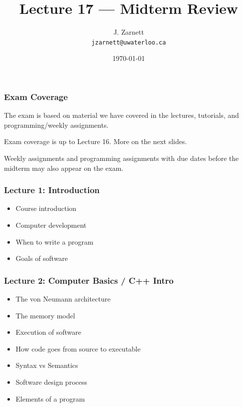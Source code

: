 

\title{Lecture 17 --- Midterm Review }

\author{J. Zarnett\\
\texttt{jzarnett@uwaterloo.ca}}
\date{\today}



\begin{frame}
  \titlepage
  
 \end{frame}




\begin{frame}
\frametitle{Exam Coverage}

The exam is based on material we have covered in the lectures, tutorials, and programming/weekly assignments.

Exam coverage is up to Lecture 16. More on the next slides.

Weekly assignments and programming assignments with due dates before the midterm may also appear on the exam. 

\end{frame}


\begin{frame}
\frametitle{Lecture 1: Introduction}

{\Large
\begin{itemize}
	\item Course introduction
	\item Computer development
	\item When to write a program
	\item Goals of software
\end{itemize}
}
\end{frame}

\begin{frame}
\frametitle{Lecture 2: Computer Basics / C++ Intro}

{\Large
\begin{itemize}
	\item The von Neumann architecture
	\item The memory model
	\item Execution of software
	\item How code goes from source to executable
	\item Syntax vs Semantics
	\item Software design process
	\item Elements of a program
\end{itemize}
}

\end{frame}



